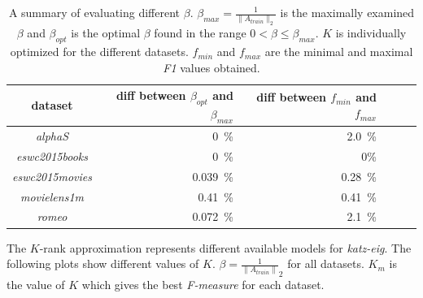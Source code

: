 \begin{table}[h!]
    \centering
    \begin{tabular}{| c | r | r | r | r | l |}
        \hline
        \textbf{dataset}        & \textbf{diff between $\beta_{opt}$ and $\beta_{max}$ }    & \textbf{diff between $f_{min}$ and $f_{max}$} \\ \hline

        \textit{alphaS}         & 0~\%      & 2.0~\%    \\ \hline
        \textit{eswc2015books}  & 0~\%      & 0\%       \\ \hline
        \textit{eswc2015movies} & 0.039~\%  & 0.28~\%   \\ \hline
        \textit{movielens1m}    & 0.41~\%   & 0.41~\%   \\ \hline
        \textit{romeo}          & 0.072~\%  & 2.1~\%    \\ \hline


    \end{tabular}
    \caption{A summary of evaluating different $\beta$. $\beta_{max} = \frac{1}{\|A_{train}\|_2}$ is the maximally examined $\beta$ and $\beta_{opt}$ is the optimal $\beta$ found in the range $0 < \beta \leq \beta_{max}$. $K$ is individually optimized for the different datasets. $f_{min}$ and $f_{max}$ are the minimal and maximal \textit{F1} values obtained.}
    \label{tab:katzeig_beta}
\end{table}

\FloatBarrier

\newpage


The $K$-rank approximation represents different available models for \textit{katz-eig}. The following plots show different values of $K$. $\beta = \frac{1}{\|A_{train}\|}_2$ for all datasets. $K_{m}$ is the value of $K$ which gives the best \textit{F-measure} for each dataset.

\FloatBarrier

